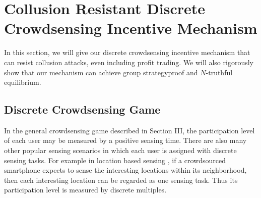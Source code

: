 \documentclass[conference]{IEEEtran}
\theoremstyle{definition}
\begin{document}
\section{Collusion Resistant Discrete Crowdsensing Incentive Mechanism}
\label{sec:discrete}

In this section, we will give our discrete crowdsensing incentive mechanism that can resist collusion attacks, even including profit trading. We will also rigorously show that our mechanism can achieve group strategyproof and $N$-truthful equilibrium.


\subsection{Discrete Crowdsensing Game}
In the general crowdsensing game described in Section III, %
the participation level of each user may be measured by a positive sensing time. %
There are also many other popular sensing scenarios in which each user is assigned with discrete sensing tasks. 
For example in location based sensing \cite{Alt2010Location,Liu2013A}, if a crowdsourced smartphone expects to sense the interesting locations within its neighborhood, then each interesting location can be regarded as one sensing task. Thus its participation level is measured by discrete multiples. 
\end{document}
